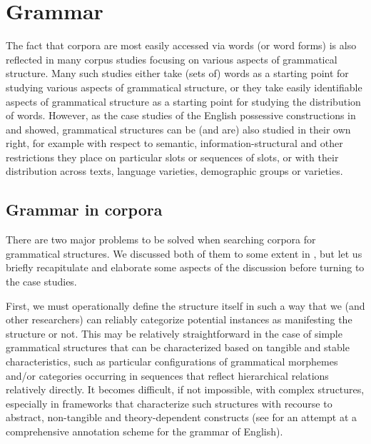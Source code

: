 \chapter{Grammar}
\label{ch:grammar}

The fact that corpora are most easily accessed via words (or word forms) is also reflected in many corpus studies focusing on various aspects of grammatical  structure. Many such studies either take (sets of) words as a starting point for studying various aspects of grammatical structure, or they take easily identifiable aspects of grammatical structure as a starting point for studying the distribution  of words. However, as the case studies of the English possessive  constructions in  and  showed, grammatical structures can be (and are) also studied in their own right, for example with respect to semantic,  information\hyp{}structural and other restrictions they place on particular slots or sequences of slots, or with their distribution  across texts, language varieties,  demographic  groups or varieties.

\section{Grammar in corpora}
\label{sec:grammarincorpora}

There are two major problems to be solved when searching corpora for grammatical  structures. We discussed both of them to some extent in , but let us briefly recapitulate and elaborate some aspects of the discussion before turning to the case studies.

First, we must operationally  define the structure itself in such a way that we (and other researchers) can reliably  categorize  potential instances as manifesting the structure or not. This may be relatively straightforward in the case of simple grammatical  structures that can be characterized based on tangible and stable characteristics, such as particular configurations of grammatical morphemes  and\slash or categories  occurring in sequences that reflect hierarchical relations relatively directly. It becomes difficult, if not impossible, with complex  structures, especially in frameworks that characterize such structures with recourse to abstract, non\hyp{}tangible and theory\hyp{}dependent constructs (see \citealt{sampson_english_1995} for an attempt at a comprehensive annotation scheme for the grammar of English).

